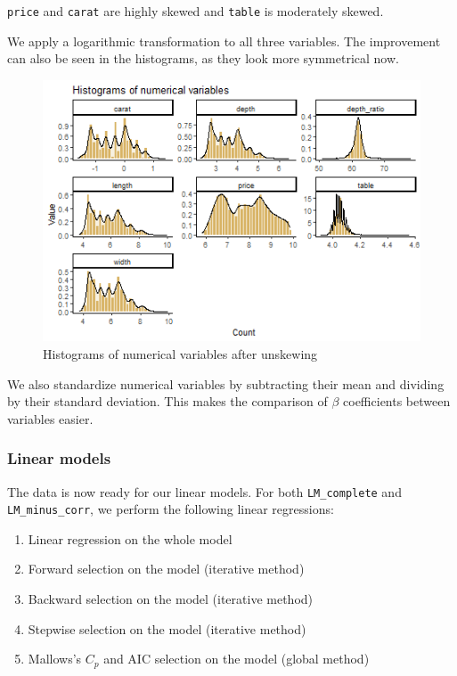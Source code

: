 \documentclass[
  paper=a4,
  ,captions=tableheading
]{scrartcl}
\providecommand{\tightlist}{%
  \setlength{\itemsep}{0pt}\setlength{\parskip}{0pt}}
\begin{document}
\texttt{price} and \texttt{carat} are highly skewed and \texttt{table}
is moderately skewed.

We apply a logarithmic transformation to all three variables. The
improvement can also be seen in the histograms, as they look more
symmetrical now.

\begin{figure}[H]

{\centering \includegraphics[width=\linewidth,]{Diamonds_PDF_files/figure-latex/hist-unskewed-1}

}

\caption{Histograms of numerical variables after unskewing}\label{fig:hist-unskewed}
\end{figure}

We also standardize numerical variables by subtracting their mean and
dividing by their standard deviation. This makes the comparison of
\(\beta\) coefficients between variables easier.

\hypertarget{linear-models}{%
\subsubsection{Linear models}\label{linear-models}}

The data is now ready for our linear models. For both
\texttt{LM\_complete} and \texttt{LM\_minus\_corr}, we perform the
following linear regressions:

\begin{enumerate}
\def\labelenumi{\arabic{enumi}.}
\tightlist
\item
  Linear regression on the whole model
\item
  Forward selection on the model (iterative method)
\item
  Backward selection on the model (iterative method)
\item
  Stepwise selection on the model (iterative method)
\item
  Mallows's \(C_p\) and AIC selection on the model (global method)
\end{enumerate}
\end{document}
